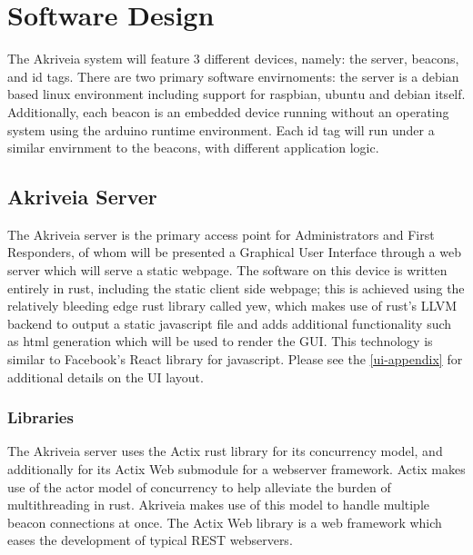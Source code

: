 

\setcounter{section}{5}
\section{Software Design}
\bigskip

The Akriveia system will feature 3 different devices, namely: the server, beacons, and id tags.
There are two primary software envirnoments: the server is a debian based linux environment including support for raspbian, ubuntu and debian itself.
Additionally, each beacon is an embedded device running without an operating system using the arduino runtime environment.
Each id tag will run under a similar envirnment to the beacons, with different application logic.

\bigskip
\subsection{Akriveia Server}

The Akriveia server is the primary access point for Administrators and First Responders, of whom will be presented a Graphical User Interface through a web server which will serve a static webpage.
The software on this device is written entirely in rust, including the static client side webpage; this is achieved using the relatively bleeding edge rust library called yew, which makes use of rust's LLVM backend to output a static javascript file and adds additional functionality such as html generation which will be used to render the GUI.
This technology is similar to Facebook's React library for javascript.
Please see the \ref{ui-appendix} for additional details on the UI layout.
\bigskip

\subsubsection{Libraries}
The Akriveia server uses the Actix rust library for its concurrency model, and additionally for its Actix Web submodule for a webserver framework.
Actix makes use of the actor model of concurrency to help alleviate the burden of multithreading in rust. Akriveia makes use of this model to handle multiple beacon connections at once.
The Actix Web library is a web framework which eases the development of typical REST webservers.

